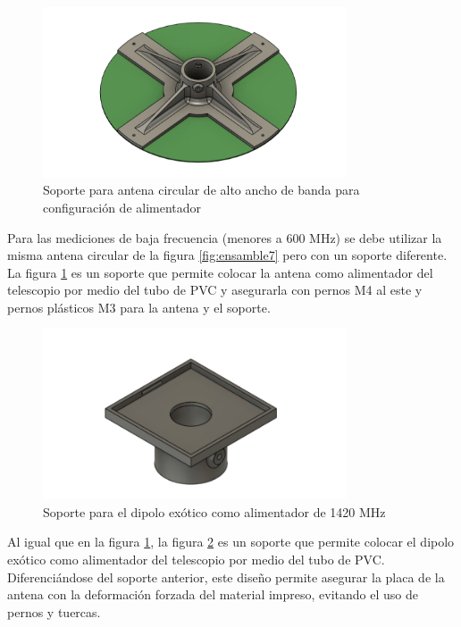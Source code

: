\begin{figure}
    \centering
    \includegraphics[width=0.8\textwidth]{img/soporte3D2}
    \caption{Soporte para antena circular de alto ancho de banda para configuración de alimentador}
    \label{fig:ensamble8}
\end{figure}

Para las mediciones de baja frecuencia (menores a 600 MHz) se debe utilizar la misma antena circular de la figura \ref{fig:ensamble7} pero con un soporte diferente. La figura \ref{fig:ensamble8} es un soporte que permite colocar la antena como alimentador del telescopio por medio del tubo de PVC y asegurarla con pernos M4 al este y pernos plásticos M3 para la antena y el soporte.\\

\begin{figure}
    \centering
    \includegraphics[width=0.8\textwidth]{img/soporte3D6}
    \caption{Soporte para el dipolo exótico como alimentador de 1420 MHz}
    \label{fig:ensamble9}
\end{figure}

Al igual que en la figura \ref{fig:ensamble8}, la figura \ref{fig:ensamble9} es un soporte que permite colocar el dipolo exótico como alimentador del telescopio por medio del tubo de PVC. Diferenciándose del soporte anterior, este diseño permite asegurar la placa de la antena con la deformación forzada del material impreso, evitando el uso de pernos y tuercas.\\

